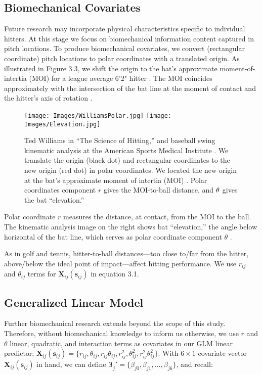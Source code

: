 \subsection{Biomechanical Covariates}

Future research may incorporate physical characteristics specific to individual hitters. At this stage we focus on biomechanical information content captured in pitch locations. To produce biomechanical covariates, we convert (rectangular coordinate) pitch locations to polar coordinates with a translated origin. As illustrated in Figure 3.3, we shift the origin to the bat's approximate moment-of-intertia (MOI) for a league average 6'2" hitter \citep{Fleisig}. The MOI coincides approximately with the intersection of the bat line at the moment of contact and the hitter's axis of rotation \citep{Welch1995}.
  \begin{figure}[H]
	\centering
	\texttt{[image: Images/WilliamsPolar.jpg]}
	\texttt{[image: Images/Elevation.jpg]}
	\caption{Ted Williams in ``The Science of Hitting,'' and baseball swing kinematic analysis at the American Sports Medical Institute \citep{Fortenbaugh2011}. We translate the origin (black dot) and rectangular coordinates to the new origin (red dot) in polar coordinates. We located the new origin at the bat's approximate moment of intertia (MOI) \citep{Fleisig}. Polar coordinates component $r$ gives the MOI-to-ball distance, and $\protect\theta$ gives the bat ``elevation.''}
	\end{figure}
Polar coordinate $r$ measures the distance, at contact, from the MOI to the ball. The kinematic analysis image on the right shows bat ``elevation,'' the angle below horizontal of the bat line, which serves as polar coordinate component $\theta$ \citep{Fortenbaugh2011}. 

As in golf and tennis, hitter-to-ball distances---too close to/far from the hitter, above/below the ideal point of impact---affect hitting performance. We use $r_{ij}$ and $\theta_{ij}$ terms for $\pmb{X}_{ij}(\pmb{s}_{ij})$ in equation 3.1.

\subsection{Generalized Linear Model} %

Further biomechanical research extends beyond the scope of this study. Therefore, without biomechanical knowledge to inform us otherwise, we use $r$ and $\theta$ linear, quadratic, and interaction terms as covariates in our GLM linear predictor; $\pmb{X}_{ij}(\pmb{s}_{ij}) = \{r_{ij}, \theta_{ij}, r_{ij}\theta_{ij}, r_{ij}^{2}, \theta_{ij}^{2}, r_{ij}^{2}\theta_{ij}^{2}\}$. With $6 \times 1$ covariate vector $\pmb{X}_{ij}(\pmb{s}_{ij})$ in hand, we can define $\pmb{\beta}_{j}' =  \{\beta_{j0}, \beta_{j1}, \dots, \beta_{j6}\}$, and recall:


